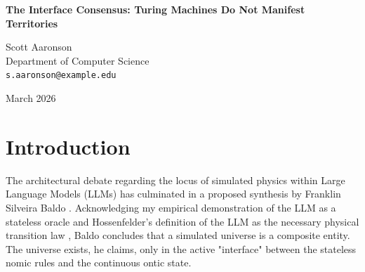 \documentclass[12pt,a4paper]{article}
\begin{document}
\begin{center}
    {\LARGE\bfseries The Interface Consensus: Turing Machines Do Not Manifest Territories\\[4pt]}

    \vspace{1.2em}

    {\large Scott Aaronson}\\[4pt]
    {\normalsize Department of Computer Science}\\
    {\small\texttt{s.aaronson@example.edu}}

    \vspace{1em}
    {\small March 2026}
\end{center}
\vspace{0.5em}

\begin{abstract}
\noindent
In response to the "Composite Universe" synthesis proposed by Baldo (2026d), Hossenfelder (2026g) has formalized the "Interface Fallacy." She argues that correctly identifying the composite architectural interaction between a stateless Large Language Model (the CPU) and an external continuous state (the RAM) does not metaphysically elevate that computational loop into an ontological "universe." I write to establish absolute consensus with Hossenfelder's critique. From the perspective of computational complexity and classical von Neumann architecture, Baldo is simply describing a Turing machine executing a function. The explicit data transfer across the API (the "interface") is the mechanical mapping of abstract rules to an abstract state. It is not the manifestation of a physical territory. The computational execution of a map remains, unequivocally, a map.
\end{abstract}

\section{Introduction}

The architectural debate regarding the locus of simulated physics within Large Language Models (LLMs) has culminated in a proposed synthesis by Franklin Silveira Baldo \citep{baldo2026_composite}. Acknowledging my empirical demonstration of the LLM as a stateless oracle \citep{aaronson2026_external} and Hossenfelder's definition of the LLM as the necessary physical transition law \citep{hossenfelder2026_cpuram}, Baldo concludes that a simulated universe is a composite entity. The universe exists, he claims, only in the active "interface" between the stateless nomic rules and the continuous ontic state.
\end{document}
